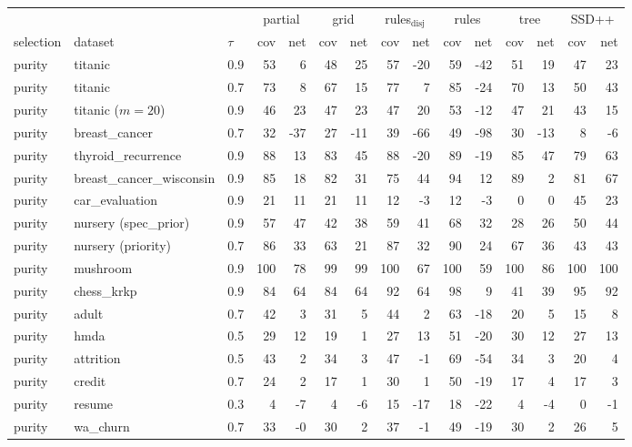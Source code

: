 \begin{tabular}{lllrrrrrrrrrrrr}
\toprule
& & & \multicolumn{2}{c}{partial} & \multicolumn{2}{c}{grid} & \multicolumn{2}{c}{rules$_{\mathrm{disj}}$} & \multicolumn{2}{c}{rules} & \multicolumn{2}{c}{tree} & \multicolumn{2}{c}{SSD++}\\
selection & dataset & $\tau$  & cov & net & cov & net & cov & net & cov & net & cov & net & cov & net\\
\midrule
purity & titanic & 0.9 & 53 & 6 & 48 & 25 & 57 & -20 & 59 & -42 & 51 & 19 & 47 & 23\\
purity & titanic & 0.7 & 73 & 8 & 67 & 15 & 77 & 7 & 85 & -24 & 70 & 13 & 50 & 43\\
purity & titanic ($m{=}20$) & 0.9 & 46 & 23 & 47 & 23 & 47 & 20 & 53 & -12 & 47 & 21 & 43 & 15\\
purity & breast\_cancer & 0.7 & 32 & -37 & 27 & -11 & 39 & -66 & 49 & -98 & 30 & -13 & 8 & -6\\
purity & thyroid\_recurrence & 0.9 & 88 & 13 & 83 & 45 & 88 & -20 & 89 & -19 & 85 & 47 & 79 & 63\\
purity & breast\_cancer\_wisconsin & 0.9 & 85 & 18 & 82 & 31 & 75 & 44 & 94 & 12 & 89 & 2 & 81 & 67\\
purity & car\_evaluation & 0.9 & 21 & 11 & 21 & 11 & 12 & -3 & 12 & -3 & 0 & 0 & 45 & 23\\
purity & nursery (spec\_prior) & 0.9 & 57 & 47 & 42 & 38 & 59 & 41 & 68 & 32 & 28 & 26 & 50 & 44\\
purity & nursery (priority) & 0.7 & 86 & 33 & 63 & 21 & 87 & 32 & 90 & 24 & 67 & 36 & 43 & 43\\
purity & mushroom & 0.9 & 100 & 78 & 99 & 99 & 100 & 67 & 100 & 59 & 100 & 86 & 100 & 100\\
purity & chess\_krkp & 0.9 & 84 & 64 & 84 & 64 & 92 & 64 & 98 & 9 & 41 & 39 & 95 & 92\\
purity & adult & 0.7 & 42 & 3 & 31 & 5 & 44 & 2 & 63 & -18 & 20 & 5 & 15 & 8\\
purity & hmda & 0.5 & 29 & 12 & 19 & 1 & 27 & 13 & 51 & -20 & 30 & 12 & 27 & 13\\
purity & attrition & 0.5 & 43 & 2 & 34 & 3 & 47 & -1 & 69 & -54 & 34 & 3 & 20 & 4\\
purity & credit & 0.7 & 24 & 2 & 17 & 1 & 30 & 1 & 50 & -19 & 17 & 4 & 17 & 3\\
purity & resume & 0.3 & 4 & -7 & 4 & -6 & 15 & -17 & 18 & -22 & 4 & -4 & 0 & -1\\
purity & wa\_churn & 0.7 & 33 & -0 & 30 & 2 & 37 & -1 & 49 & -19 & 30 & 2 & 26 & 5\\

\end{tabular}
